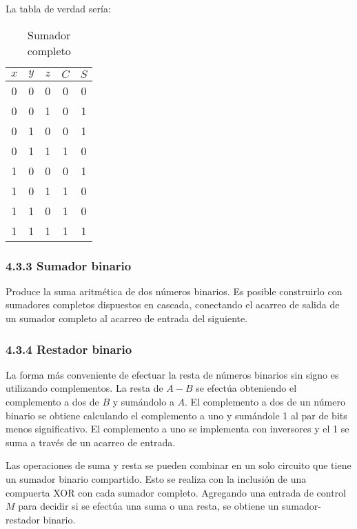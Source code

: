 \begin{flushleft}
    La tabla de verdad ser\'{i}a:
\end{flushleft}

\begin{table}[h]
    \centering
    \begin{tabular}{ccc|cc}
        \toprule
        $x$ & $y$ & $z$ & $C$ & $S$ \\
        \midrule
        0   & 0   & 0   & 0   & 0   \\
        0   & 0   & 1   & 0   & 1   \\
        0   & 1   & 0   & 0   & 1   \\
        0   & 1   & 1   & 1   & 0   \\
        1   & 0   & 0   & 0   & 1   \\
        1   & 0   & 1   & 1   & 0   \\
        1   & 1   & 0   & 1   & 0   \\
        1   & 1   & 1   & 1   & 1   \\
        \bottomrule
    \end{tabular}
    \caption{Sumador completo}
\end{table}

\newpage
\subsubsection*{4.3.3 Sumador binario}
Produce la suma aritm\'{e}tica de dos n\'{u}meros binarios. Es posible construirlo con 
sumadores completos dispuestos en cascada, conectando el acarreo de salida de un sumador
completo al acarreo de entrada del siguiente.

\subsubsection*{4.3.4 Restador binario}
La forma m\'{a}s conveniente de efectuar la resta de n\'{u}meros binarios sin signo es
utilizando complementos. La resta de $A - B$ se efect\'{u}a obteniendo el complemento
a dos de $B$ y sum\'{a}ndolo a $A$. El complemento a dos de un n\'{u}mero binario se
obtiene calculando el complemento a uno y sum\'{a}ndole 1 al par de bits menos significativo.
El complemento a uno se implementa con inversores y el 1 se suma a trav\'{e}s de un acarreo
de entrada.

Las operaciones de suma y resta se pueden combinar en un solo circuito que tiene un sumador
binario compartido. Esto se realiza con la inclusi\'{o}n de una compuerta XOR con cada sumador
completo. Agregando una entrada de control $M$ para decidir si se efect\'{u}a una suma o una
resta, se obtiene un sumador-restador binario.

